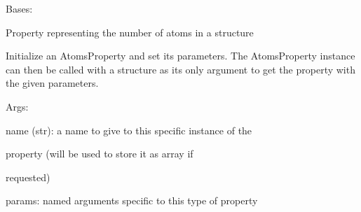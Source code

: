 \documentclass[letterpaper,10pt,english]{sphinxmanual}
\begin{document}
\begin{fulllineitems}
\label{doctree/soprano.properties.basic.basic:soprano.properties.basic.basic.NumAtoms}
Bases: {\hyperref[doctree/soprano.properties.atomsproperty:soprano.properties.atomsproperty.AtomsProperty]{\emph{}}}

Property representing the number of atoms in a structure

Initialize an AtomsProperty and set its parameters.
The AtomsProperty instance can then be called with a structure as its
only argument to get the property with the given parameters.

\begin{DUlineblock}{0em}
\item[] Args:
\item[]
\begin{DUlineblock}{\DUlineblockindent}
\item[] name (str): a name to give to this specific instance of the
\item[]
\begin{DUlineblock}{\DUlineblockindent}
\item[] property (will be used to store it as array if
\item[] requested)
\end{DUlineblock}
\item[] params: named arguments specific to this type of property
\end{DUlineblock}
\end{DUlineblock}

\begin{fulllineitems}
\label{doctree/soprano.properties.basic.basic:soprano.properties.basic.basic.NumAtoms.default_name}
\end{fulllineitems}


\begin{fulllineitems}
\label{doctree/soprano.properties.basic.basic:soprano.properties.basic.basic.NumAtoms.default_params}
\end{fulllineitems}


\begin{fulllineitems}
\label{doctree/soprano.properties.basic.basic:soprano.properties.basic.basic.NumAtoms.extract}
\end{fulllineitems}


\end{fulllineitems}
\end{document}

